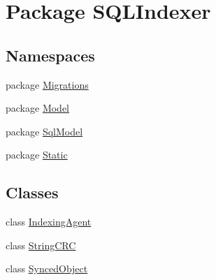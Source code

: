\hypertarget{namespace_s_q_l_indexer}{\section{Package S\-Q\-L\-Indexer}
\label{namespace_s_q_l_indexer}
}
\subsection*{Namespaces}
\begin{DoxyCompactItemize}
\item 
package \hyperlink{namespace_s_q_l_indexer_1_1_migrations}{Migrations}
\item 
package \hyperlink{namespace_s_q_l_indexer_1_1_model}{Model}
\item 
package \hyperlink{namespace_s_q_l_indexer_1_1_sql_model}{Sql\-Model}
\item 
package \hyperlink{namespace_s_q_l_indexer_1_1_static}{Static}
\end{DoxyCompactItemize}
\subsection*{Classes}
\begin{DoxyCompactItemize}
\item 
class \hyperlink{class_s_q_l_indexer_1_1_indexing_agent}{Indexing\-Agent}
\item 
class \hyperlink{class_s_q_l_indexer_1_1_string_c_r_c}{String\-C\-R\-C}
\item 
class \hyperlink{class_s_q_l_indexer_1_1_synced_object}{Synced\-Object}
\end{DoxyCompactItemize}

